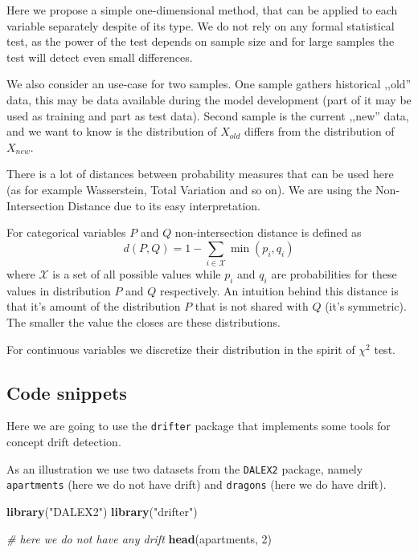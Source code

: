 \documentclass[]{krantz}
\newenvironment{Shaded}{\begin{snugshade}}{\end{snugshade}}
\newcommand{\CommentTok}[1]{\textcolor[rgb]{0.56,0.35,0.01}{\textit{#1}}}
\newcommand{\DecValTok}[1]{\textcolor[rgb]{0.00,0.00,0.81}{#1}}
\newcommand{\KeywordTok}[1]{\textcolor[rgb]{0.13,0.29,0.53}{\textbf{#1}}}
\newcommand{\NormalTok}[1]{#1}
\newcommand{\StringTok}[1]{\textcolor[rgb]{0.31,0.60,0.02}{#1}}
\theoremstyle{definition}
\theoremstyle{definition}
\theoremstyle{definition}
\theoremstyle{remark}
\begin{document}
Here we propose a simple one-dimensional method, that can be applied to
each variable separately despite of its type. We do not rely on any
formal statistical test, as the power of the test depends on sample size
and for large samples the test will detect even small differences.

We also consider an use-case for two samples. One sample gathers
historical ,,old'' data, this may be data available during the model
development (part of it may be used as training and part as test data).
Second sample is the current ,,new'' data, and we want to know is the
distribution of \(X_{old}\) differs from the distribution of
\(X_{new}\).

There is a lot of distances between probability measures that can be
used here (as for example Wasserstein, Total Variation and so on). We
are using the Non-Intersection Distance due to its easy interpretation.

For categorical variables \(P\) and \(Q\) non-intersection distance is
defined as \[
d(P,Q) = 1 - \sum_{i\in \mathcal X} \min(p_i, q_i)
\] where \(\mathcal X\) is a set of all possible values while \(p_i\)
and \(q_i\) are probabilities for these values in distribution \(P\) and
\(Q\) respectively. An intuition behind this distance is that it's
amount of the distribution \(P\) that is not shared with \(Q\) (it's
symmetric). The smaller the value the closes are these distributions.

For continuous variables we discretize their distribution in the spirit
of \(\chi^2\) test.

\hypertarget{code-snippets-2}{%
\subsection{Code snippets}\label{code-snippets-2}}

Here we are going to use the \texttt{drifter} package that implements
some tools for concept drift detection.

As an illustration we use two datasets from the \texttt{DALEX2} package,
namely \texttt{apartments} (here we do not have drift) and
\texttt{dragons} (here we do have drift).

\begin{Shaded}
\begin{Highlighting}[]
\KeywordTok{library}\NormalTok{(}\StringTok{"DALEX2"}\NormalTok{)}
\KeywordTok{library}\NormalTok{(}\StringTok{"drifter"}\NormalTok{)}

\CommentTok{# here we do not have any drift}
\KeywordTok{head}\NormalTok{(apartments, }\DecValTok{2}\NormalTok{)}
\end{Highlighting}
\end{Shaded}
\end{document}
